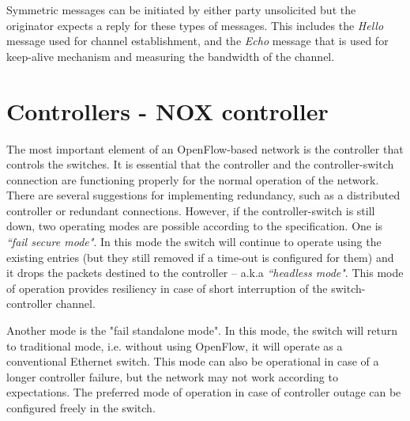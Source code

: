 \documentclass{article}
\begin{document}
Symmetric messages can be initiated by either party unsolicited but the originator expects a reply for these types of messages. This includes the \emph{Hello} message used for channel establishment, and the \emph{Echo} message that is used for keep-alive mechanism and measuring the bandwidth of the channel.

\section{Controllers - NOX controller}

The most important element of an OpenFlow-based network is the controller that controls the switches. It is essential that the controller and the controller-switch connection are functioning properly for the normal operation of the network. There are several suggestions for implementing redundancy, such as a distributed controller or redundant connections. 
However, if the controller-switch is still down, two operating modes are possible according to the specification. One is \emph{``fail secure mode"}. In this mode the switch will continue to operate using the existing entries (but they still removed if a time-out is configured for them) and it drops the packets destined to the controller -- a.k.a \emph{``headless mode"}. This mode of operation provides resiliency in case of short interruption of the switch-controller channel.

Another mode is the "fail standalone mode". In this mode, the switch will return to traditional mode, i.e. without using OpenFlow, it will operate as a conventional Ethernet switch. This mode can also be operational in case of a longer controller failure, but the network may not work according to expectations. The preferred mode of operation in case of controller outage can be configured freely in the switch.
\end{document}
